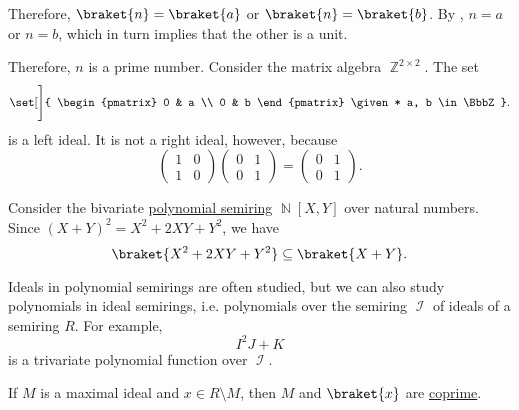 \begin{example}
\begin{thmenum}
    Therefore, \( \braket{ n } = \braket{ a } \) or \( \braket{ n } = \braket{ b } \). By , \( n = a \) or \( n = b \), which in turn implies that the other is a unit.

    Therefore, \( n \) is a prime number.
     Consider the matrix algebra \( \BbbZ^{2 \times 2} \). The set
    \begin{equation*}
      \set[\Bigg]
      {
        \begin{pmatrix}
          0 & a \\
          0 & b
        \end{pmatrix}
        \given*
        a, b \in \BbbZ
      }.
    \end{equation*}
    is a left ideal. It is not a right ideal, however, because
    \begin{equation*}
      \begin{pmatrix}
        1 & 0 \\
        1 & 0
      \end{pmatrix}
      \begin{pmatrix}
        0 & 1 \\
        0 & 1
      \end{pmatrix}
      =
      \begin{pmatrix}
        0 & 1 \\
        0 & 1
      \end{pmatrix}.
    \end{equation*}

     Consider the bivariate \hyperref[def:polynomial_algebra]{polynomial semiring} \( \BbbN[X, Y] \) over natural numbers. Since \( (X + Y)^2 = X^2 + 2XY + Y^2 \), we have
    \begin{equation*}
      \braket{ X^2 + 2XY + Y^2 } \subseteq \braket{ X + Y }.
    \end{equation*}

     Ideals in polynomial semirings are often studied, but we can also study polynomials in ideal semirings, i.e. polynomials over the semiring \( \mscrI \) of ideals of a semiring \( R \). For example,
    \begin{equation*}
      I^2 J + K
    \end{equation*}
    is a trivariate polynomial function over \( \mscrI \).

     If \( M \) is a maximal ideal and \( x \in R \setminus M \), then \( M \) and \( \braket{ x } \) are \hyperref[def:semiring_ideal/coprime]{coprime}.
  \end{thmenum}
\end{example}

